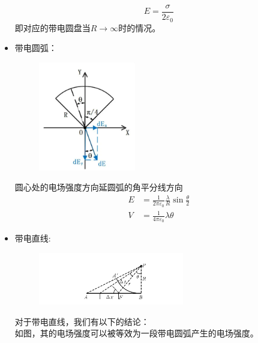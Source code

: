 \documentclass{ctexart}
\begin{document}
\begin{itemize}
\begin{figure}[H]
    \end{figure}
    $$
        E = \frac{\sigma}{2\varepsilon_0}
    $$
    即对应的带电圆盘当$R \to \infty$时的情况。
    \item 带电圆弧：
    \begin{figure}[H]
        \centering
        \includegraphics[width=0.4\textwidth]{img/rho.png}
    \end{figure}
    圆心处的电场强度方向延圆弧的角平分线方向
    \begin{align*}
        E &= \frac{1}{2\pi \varepsilon_0} \frac{\lambda}{R} \sin \frac{\theta}{2} \\
        V &= \frac{1}{4\pi\varepsilon_0} \lambda \theta
    \end{align*}
    \item 带电直线:
    \begin{figure}[H]
        \centering
        \includegraphics[width=0.6\textwidth]{img/linerho.png}
    \end{figure}
    对于带电直线，我们有以下的结论：\\
    如图，其的电场强度可以被等效为一段带电圆弧产生的电场强度。

\end{itemize}
\end{document}
